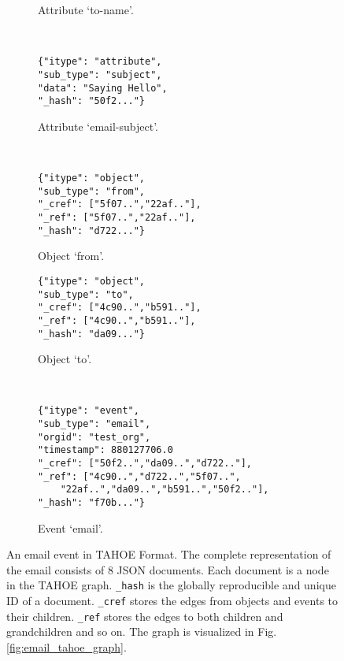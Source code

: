 \begin{figure}[!ht]
\begin{minipage}{.29\textwidth}
\begin{subfigure}{\linewidth}
            \caption{Attribute `to-name'.}
            \label{fig:ant}
        \end{subfigure}\\[0.5\baselineskip]
        \begin{subfigure}{\linewidth}
            \begin{verbatim}
{"itype": "attribute",
"sub_type": "subject",
"data": "Saying Hello",
"_hash": "50f2..."}
            \end{verbatim}
            \caption{Attribute `email-subject'.}
            \label{fig:asub}
        \end{subfigure}\\[0.5\baselineskip]
        \begin{subfigure}{\linewidth}

            \begin{verbatim}
{"itype": "object",
"sub_type": "from",
"_cref": ["5f07..","22af.."],
"_ref": ["5f07..","22af.."],
"_hash": "d722..."}
            \end{verbatim}

            \caption{Object `from'.}
            \label{fig:tof}
        \end{subfigure}
    \end{minipage}%
    \hfill
    \begin{minipage}{.4\textwidth}
        \begin{subfigure}{\linewidth}

            \begin{verbatim}
{"itype": "object",
"sub_type": "to",
"_cref": ["4c90..","b591.."],
"_ref": ["4c90..","b591.."],
"_hash": "da09..."}
            \end{verbatim}

            \caption{Object `to'.}
            \label{fig:tot}
        \end{subfigure}\\[0.5\baselineskip]
        \begin{subfigure}{\linewidth}

            \begin{verbatim}
{"itype": "event",
"sub_type": "email",
"orgid": "test_org",
"timestamp": 880127706.0
"_cref": ["50f2..","da09..","d722.."],
"_ref": ["4c90..","d722..","5f07..",
    "22af..","da09..","b591..","50f2.."],
"_hash": "f70b..."}
            \end{verbatim}

            \caption{Event `email'.}
            \label{fig:te}
        \end{subfigure}
    \end{minipage}
    \caption{An email event in TAHOE Format. The complete representation of the email consists of $8$ JSON documents. Each document is a node in the TAHOE graph. \texttt{\_hash} is the globally reproducible and unique ID of a document. \texttt{\_cref} stores the edges from objects and events to their children. \texttt{\_ref} stores the edges to both children and grandchildren and so on. The graph is visualized in Fig. \ref{fig:email_tahoe_graph}.}
    \label{fig:email_tahoe}
\end{figure}

